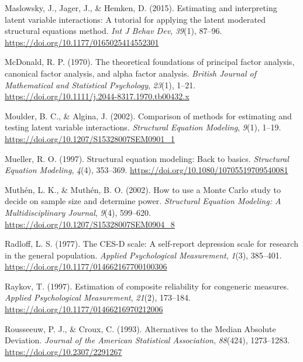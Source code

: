 \documentclass[
  man]{apa6}
\newlength{\cslhangindent}
\newenvironment{CSLReferences}[2] %
 {\begin{list}{}{%
  \setlength{\itemindent}{0pt}
  \setlength{\leftmargin}{0pt}
  \setlength{\parsep}{0pt}
  \ifodd #1
   \setlength{\leftmargin}{\cslhangindent}
   \setlength{\itemindent}{-1\cslhangindent}
  \fi
  \setlength{\itemsep}{#2\baselineskip}}}
 {\end{list}}
\begin{document}
\begin{CSLReferences}{1}{0}
Maslowsky, J., Jager, J., \& Hemken, D. (2015). Estimating and interpreting latent variable interactions: {A} tutorial for applying the latent moderated structural equations method. \emph{Int J Behav Dev}, \emph{39}(1), 87--96. \url{https://doi.org/10.1177/0165025414552301}

McDonald, R. P. (1970). The theoretical foundations of principal factor analysis, canonical factor analysis, and alpha factor analysis. \emph{British Journal of Mathematical and Statistical Psychology}, \emph{23}(1), 1--21. \url{https://doi.org/10.1111/j.2044-8317.1970.tb00432.x}

Moulder, B. C., \& Algina, J. (2002). Comparison of methods for estimating and testing latent variable interactions. \emph{Structural Equation Modeling}, \emph{9}(1), 1--19. \url{https://doi.org/10.1207/S15328007SEM0901_1}

Mueller, R. O. (1997). Structural equation modeling: {Back} to basics. \emph{Structural Equation Modeling}, \emph{4}(4), 353--369. \url{https://doi.org/10.1080/10705519709540081}

Muthén, L. K., \& Muthén, B. O. (2002). How to use a {Monte Carlo} study to decide on sample size and determine power. \emph{Structural Equation Modeling: A Multidisciplinary Journal}, \emph{9}(4), 599--620. \url{https://doi.org/10.1207/S15328007SEM0904_8}

Radloff, L. S. (1977). The {CES-D} scale: {A} self-report depression scale for research in the general population. \emph{Applied Psychological Measurement}, \emph{1}(3), 385--401. \url{https://doi.org/10.1177/014662167700100306}

Raykov, T. (1997). Estimation of composite reliability for congeneric measures. \emph{Applied Psychological Measurement}, \emph{21}(2), 173--184. \url{https://doi.org/10.1177/01466216970212006}

Rousseeuw, P. J., \& Croux, C. (1993). Alternatives to the {Median Absolute Deviation}. \emph{Journal of the American Statistical Association}, \emph{88}(424), 1273--1283. \url{https://doi.org/10.2307/2291267}


\end{CSLReferences}
\end{document}
